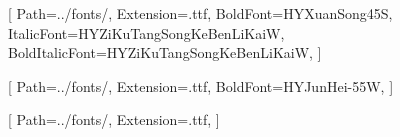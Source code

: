 [%
    Path=../fonts/,
    Extension=.ttf,
    BoldFont=HYXuanSong45S,
    ItalicFont=HYZiKuTangSongKeBenLiKaiW,
    BoldItalicFont=HYZiKuTangSongKeBenLiKaiW,
]

[%
    Path=../fonts/,
    Extension=.ttf,
    BoldFont=HYJunHei-55W,
]

[
    Path=../fonts/,
    Extension=.ttf,
]
